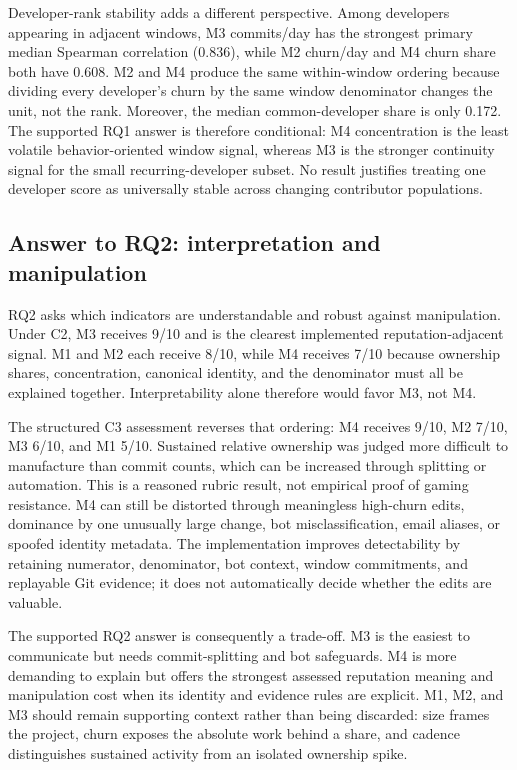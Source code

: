 Developer-rank stability adds a different perspective. Among developers appearing in adjacent windows, M3 commits/day has
the strongest primary median Spearman correlation (0.836), while M2 churn/day and M4 churn share both have 0.608. M2 and M4
produce the same within-window ordering because dividing every developer's churn by the same window denominator changes the
unit, not the rank. Moreover, the median common-developer share is only 0.172. The supported RQ1 answer is therefore
conditional: M4 concentration is the least volatile behavior-oriented window signal, whereas M3 is the stronger continuity
signal for the small recurring-developer subset. No result justifies treating one developer score as universally stable
across changing contributor populations.

\subsection{Answer to RQ2: interpretation and manipulation}
\label{sec:final_rq2}

RQ2 asks which indicators are understandable and robust against manipulation. Under C2, M3 receives 9/10 and is the clearest
implemented reputation-adjacent signal. M1 and M2 each receive 8/10, while M4 receives 7/10 because ownership shares,
concentration, canonical identity, and the denominator must all be explained together. Interpretability alone therefore
would favor M3, not M4.

The structured C3 assessment reverses that ordering: M4 receives 9/10, M2 7/10, M3 6/10, and M1 5/10. Sustained relative
ownership was judged more difficult to manufacture than commit counts, which can be increased through splitting or
automation. This is a reasoned rubric result, not empirical proof of gaming resistance. M4 can still be distorted through
meaningless high-churn edits, dominance by one unusually large change, bot misclassification, email aliases, or spoofed
identity metadata. The implementation improves detectability by retaining numerator, denominator, bot context, window
commitments, and replayable Git evidence; it does not automatically decide whether the edits are valuable.

The supported RQ2 answer is consequently a trade-off. M3 is the easiest to communicate but needs commit-splitting and bot
safeguards. M4 is more demanding to explain but offers the strongest assessed reputation meaning and manipulation cost when
its identity and evidence rules are explicit. M1, M2, and M3 should remain supporting context rather than being discarded:
size frames the project, churn exposes the absolute work behind a share, and cadence distinguishes sustained activity from an
isolated ownership spike.

